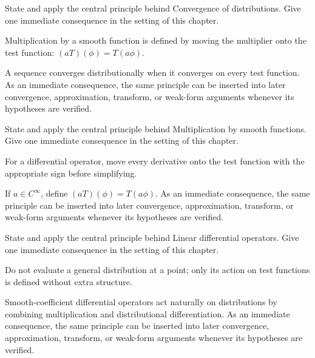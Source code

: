 \begin{exercise}\label{exr:iii16-06}
State and apply the central principle behind Convergence of distributions. Give one immediate consequence in the setting of this chapter.
\end{exercise}
\begin{hint}
Multiplication by a smooth function is defined by moving the multiplier onto the test function: \((aT)(\phi)=T(a\phi)\).
\end{hint}
\begin{solution}
A sequence converges distributionally when it converges on every test function. As an immediate consequence, the same principle can be inserted into later convergence, approximation, transform, or weak-form arguments whenever its hypotheses are verified.
\end{solution}

\begin{exercise}\label{exr:iii16-07}
State and apply the central principle behind Multiplication by smooth functions. Give one immediate consequence in the setting of this chapter.
\end{exercise}
\begin{hint}
For a differential operator, move every derivative onto the test function with the appropriate sign before simplifying.
\end{hint}
\begin{solution}
If $a\in C^\infty$, define $(aT)(\phi)=T(a\phi)$. As an immediate consequence, the same principle can be inserted into later convergence, approximation, transform, or weak-form arguments whenever its hypotheses are verified.
\end{solution}

\begin{exercise}\label{exr:iii16-08}
State and apply the central principle behind Linear differential operators. Give one immediate consequence in the setting of this chapter.
\end{exercise}
\begin{hint}
Do not evaluate a general distribution at a point; only its action on test functions is defined without extra structure.
\end{hint}
\begin{solution}
Smooth-coefficient differential operators act naturally on distributions by combining multiplication and distributional differentiation. As an immediate consequence, the same principle can be inserted into later convergence, approximation, transform, or weak-form arguments whenever its hypotheses are verified.
\end{solution}


